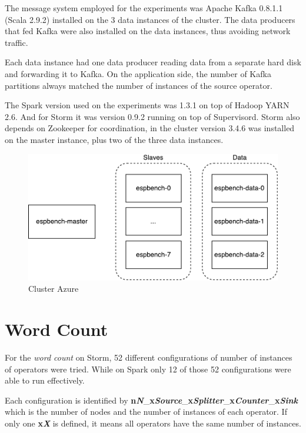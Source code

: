 \documentclass[ppgc,diss,english]{iiufrgs}
\begin{document}
The message system employed for the experiments was Apache Kafka 0.8.1.1 (Scala 2.9.2) installed on the 3 data instances of the cluster. The data producers that fed Kafka were also installed on the data instances, thus avoiding network traffic.

Each data instance had one data producer reading data from a separate hard disk and forwarding it to Kafka. On the application side, the number of Kafka partitions always matched the number of instances of the source operator.

The Spark version used on the experiments was 1.3.1 on top of Hadoop YARN 2.6. And for Storm it was version 0.9.2 running on top of Supervisord. Storm also depends on Zookeeper for coordination, in the cluster version 3.4.6 was installed on the master instance, plus two of the three data instances.

\begin{figure}[h]
    \centering
	\includegraphics[width=.8\textwidth]{images/cluster_azure.pdf}
	\caption{Cluster Azure}
	\label{fig:cluster_azure}
\end{figure}




\section{Word Count}

For the \textit{word count} on Storm, 52 different configurations of number of instances of operators were tried. While on Spark only 12 of those 52 configurations were able to run effectively.

Each configuration is identified by \textbf{n\textit{N}}\_\textbf{x\textit{Source}}\_\textbf{x\textit{Splitter}}\_\textbf{x\textit{Counter}}\_\textbf{x\textit{Sink}} which is the number of nodes and the number of instances of each operator. If only one \textbf{x\textit{X}} is defined, it means all operators have the same number of instances.
\end{document}
